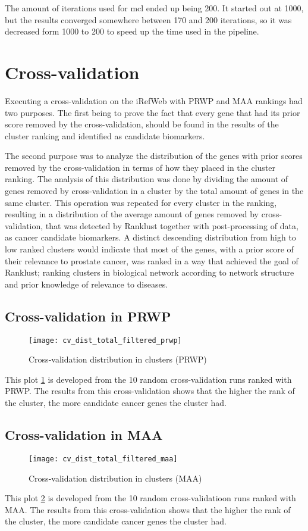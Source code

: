 The amount of iterations used for \gls{mcl} ended up being 200. It started out
at 1000, but the results converged somewhere between 170 and 200 iterations, so
it was decreased form 1000 to 200 to speed up the time used in the
\gls{pipeline}.

\section{Cross-validation}
Executing a cross-validation on the iRefWeb with PRWP and MAA rankings had two
purposes. The first being to prove the fact that every gene that had its prior
score removed by the cross-validation, should be found in the results of the
cluster ranking and identified as candidate biomarkers. 

The second purpose was to analyze the distribution of the genes with prior
scores removed by the cross-validation in terms of how they placed in the
cluster ranking. The analysis of this distribution was done by dividing the
amount of genes removed by cross-validation in a cluster by the total amount of
genes in the same cluster. This operation was repeated for every cluster in the
ranking, resulting in a distribution of the average amount of genes removed by
cross-validation, that was detected by Ranklust together with post-processing of
data, as cancer candidate biomarkers. A distinct descending distribution from
high to low ranked clusters would indicate that most of the genes, with a prior
score of their relevance to prostate cancer, was ranked in a way that achieved
the goal of Ranklust; ranking clusters in biological network according to
network structure and prior knowledge of relevance to diseases.

\subsection{Cross-validation in PRWP}
\begin{figure}[H]
    \texttt{[image: cv\_dist\_total\_filtered\_prwp]}
    \label{fig:irefweb-prwp}
    \caption{Cross-validation distribution in clusters (PRWP)}
\end{figure}
This plot \ref{fig:irefweb-prwp} is developed from the 10 random
cross-validation runs ranked with PRWP. The results from this cross-validation
shows that the higher the rank of the cluster, the more candidate cancer genes
the cluster had.

\subsection{Cross-validation in MAA}
\begin{figure}[H]
    \texttt{[image: cv\_dist\_total\_filtered\_maa]}
    \label{fig:irefweb-maa}
    \caption{Cross-validation distribution in clusters (MAA)}
\end{figure}
This plot \ref{fig:irefweb-maa} is developed from the 10 random
cross-validatioon runs ranked with MAA. The results from this cross-validation
shows that the higher the rank of the cluster, the more candidate cancer genes
the cluster had.

